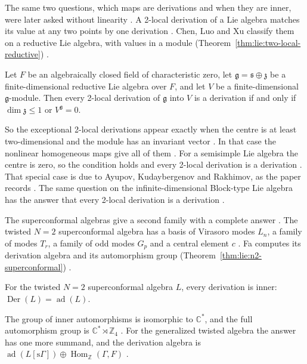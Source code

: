 The same two questions, which maps are derivations and when they are inner,
were later asked without linearity \cite[p.~1]{ChenLuoXu2026}. A 2-local
derivation of a Lie algebra matches its value at any two points by one
derivation \cite[p.~1]{ChenLuoXu2026}. Chen, Luo and Xu classify them on a
reductive Lie algebra, with values in a module
(Theorem~\ref{thm:lie:two-local-reductive}) \cite[p.~1]{ChenLuoXu2026}.

\begin{theorem}\label{thm:lie:two-local-reductive}
Let $F$ be an algebraically closed field of characteristic zero, let
$\mathfrak{g}=\mathfrak{s}\oplus\mathfrak{z}$ be a finite-dimensional
reductive Lie algebra over $F$, and let $V$ be a finite-dimensional
$\mathfrak{g}$-module. Then every 2-local derivation of $\mathfrak{g}$
into $V$ is a derivation if and only if $\dim\mathfrak{z}\leq 1$ or
$V^{\mathfrak{g}}=0$.
\end{theorem}

So the exceptional 2-local derivations appear exactly when the centre is at
least two-dimensional and the module has an invariant vector
\cite[p.~2]{ChenLuoXu2026}. In that case the nonlinear homogeneous maps give
all of them \cite[p.~2]{ChenLuoXu2026}. For a semisimple Lie algebra the
centre is zero, so the condition holds and every 2-local derivation is a
derivation \cite[p.~1]{ChenLuoXu2026}. That special case is due to Ayupov,
Kudaybergenov and Rakhimov, as the paper records
\cite[p.~1]{ChenLuoXu2026}. The same question on
the infinite-dimensional Block-type Lie algebra has the answer that every
2-local derivation is a derivation \cite[Theorem~3.6, p.~9]{ChenGuo2026}.

The superconformal algebras give a second family with a complete answer
\cite[p.~1]{Fa2013N2}. The twisted $N=2$ superconformal algebra has a basis of
Virasoro modes $L_n$, a family of modes $T_r$, a family of odd modes $G_p$ and
a central element $c$ \cite[p.~1]{Fa2013N2}. Fa computes its derivation
algebra and its automorphism group (Theorem~\ref{thm:lie:n2-superconformal})
\cite[p.~2]{Fa2013N2}.

\begin{theorem}[{\cite[Theorem~1.1, p.~2]{Fa2013N2}}]\label{thm:lie:n2-superconformal}
For the twisted $N=2$ superconformal algebra $L$, every derivation is inner:
$\operatorname{Der}(L)=\operatorname{ad}(L)$.
\end{theorem}

The group of inner automorphisms is isomorphic to $\mathbb{C}^{*}$, and the
full automorphism group is $\mathbb{C}^{*}\rtimes\mathbb{Z}_4$
\cite[Theorem~1.5 and Corollary~1.6, p.~4]{Fa2013N2}. For the generalized
twisted algebra the answer has one more summand, and the derivation algebra is
$\operatorname{ad}(L[\mathrm{s}\Gamma])\oplus\operatorname{Hom}_{\mathbb{Z}}(\Gamma,F)$
\cite[Theorem~4.1, p.~18]{Fa2013N2}.

